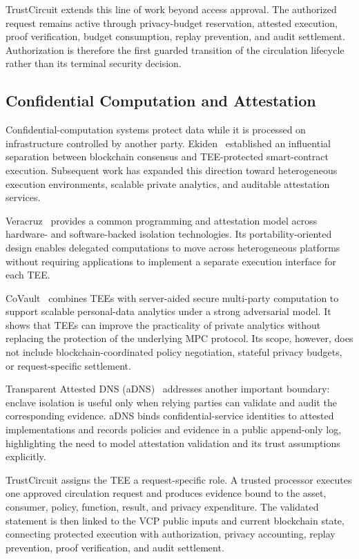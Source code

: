 \documentclass[10pt,journal,compsoc]{IEEEtran}
\begin{document}
TrustCircuit extends this line of work beyond access approval. The authorized request remains active through privacy-budget reservation, attested execution, proof verification, budget consumption, replay prevention, and audit settlement. Authorization is therefore the first guarded transition of the circulation lifecycle rather than its terminal security decision.

\subsection{Confidential Computation and Attestation}

Confidential-computation systems protect data while it is processed on infrastructure controlled by another party. Ekiden~\cite{cheng2019ekiden} established an influential separation between blockchain consensus and TEE-protected smart-contract execution. Subsequent work has expanded this direction toward heterogeneous execution environments, scalable private analytics, and auditable attestation services.

Veracruz~\cite{brossard2023private} provides a common programming and attestation model across hardware- and software-backed isolation technologies. Its portability-oriented design enables delegated computations to move across heterogeneous platforms without requiring applications to implement a separate execution interface for each TEE.

CoVault~\cite{de2025covault} combines TEEs with server-aided secure multi-party computation to support scalable personal-data analytics under a strong adversarial model. It shows that TEEs can improve the practicality of private analytics without replacing the protection of the underlying MPC protocol. Its scope, however, does not include blockchain-coordinated policy negotiation, stateful privacy budgets, or request-specific settlement.

Transparent Attested DNS (aDNS)~\cite{delignat2025transparent} addresses another important boundary: enclave isolation is useful only when relying parties can validate and audit the corresponding evidence. aDNS binds confidential-service identities to attested implementations and records policies and evidence in a public append-only log, highlighting the need to model attestation validation and its trust assumptions explicitly.

TrustCircuit assigns the TEE a request-specific role. A trusted processor executes one approved circulation request and produces evidence bound to the asset, consumer, policy, function, result, and privacy expenditure. The validated statement is then linked to the VCP public inputs and current blockchain state, connecting protected execution with authorization, privacy accounting, replay prevention, proof verification, and audit settlement.
\end{document}
